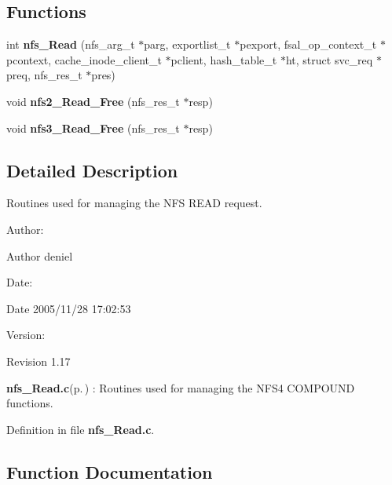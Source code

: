 \subsection*{Functions}
\begin{CompactItemize}
\item 
int {\bf nfs\_\-Read} (nfs\_\-arg\_\-t $\ast$parg, exportlist\_\-t $\ast$pexport, fsal\_\-op\_\-context\_\-t $\ast$pcontext, cache\_\-inode\_\-client\_\-t $\ast$pclient, hash\_\-table\_\-t $\ast$ht, struct svc\_\-req $\ast$preq, nfs\_\-res\_\-t $\ast$pres)
\item 
void {\bf nfs2\_\-Read\_\-Free} (nfs\_\-res\_\-t $\ast$resp)
\item 
void {\bf nfs3\_\-Read\_\-Free} (nfs\_\-res\_\-t $\ast$resp)
\end{CompactItemize}


\subsection{Detailed Description}
Routines used for managing the NFS READ request. 

\begin{Desc}
\item[Author:]\begin{Desc}
\item[Author]deniel \end{Desc}
\end{Desc}
\begin{Desc}
\item[Date:]\begin{Desc}
\item[Date]2005/11/28 17:02:53 \end{Desc}
\end{Desc}
\begin{Desc}
\item[Version:]\begin{Desc}
\item[Revision]1.17 \end{Desc}
\end{Desc}
{\bf nfs\_\-Read.c}{\rm (p.\,\pageref{nfs__Read_8c})} : Routines used for managing the NFS4 COMPOUND functions.

Definition in file {\bf nfs\_\-Read.c}.

\subsection{Function Documentation}

